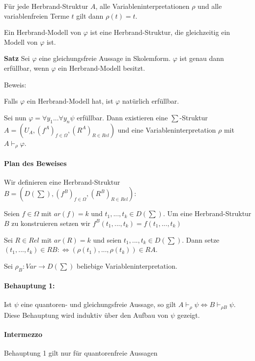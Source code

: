 \documentclass[a4paper]{article}
\renewcommand{\note}[2]{\begin{noteBox} \textbf{#1} #2 \end{noteBox}}
\begin{document}
\begin{multicols}{3}
  Für jede Herbrand-Struktur $A$, alle Variableninterpretationen $\rho$ und alle variablenfreien Terme $t$ gilt dann $\rho(t) =t$.

  Ein Herbrand-Modell von $\varphi$ ist eine Herbrand-Struktur, die gleichzeitig ein Modell von $\varphi$ ist.

  \note{Satz}{Sei $\varphi$ eine gleichungsfreie Aussage in Skolemform. $\varphi$ ist genau dann erfüllbar, wenn $\varphi$ ein Herbrand-Modell besitzt.}

  Beweis:
  \begin{itemize*}
    \item Falls $\varphi$ ein Herbrand-Modell hat, ist $\varphi$ natürlich erfüllbar.
    \item Sei nun $\varphi=\forall y_1...\forall y_n\psi$ erfüllbar. Dann existieren eine $\sum$-Struktur $A=(U_A,(f^A)_{f\in\Omega},(R^A)_{R\in Rel})$ und eine Variableninterpretation $\rho$ mit $A\vdash_\rho \varphi$.
  \end{itemize*}

  \paragraph{Plan des Beweises}
  Wir definieren eine Herbrand-Struktur $B=(D(\sum),(f^B)_{f\in\Omega},(R^B)_{R\in Rel})$:
  \begin{itemize*}
    \item Seien $f\in\Omega$ mit $ar(f)=k$ und $t_1,...,t_k\in D(\sum)$. Um eine Herbrand-Struktur $B$ zu konstruieren setzen wir $f^B(t_1,...,t_k) =f(t_1,...,t_k)$
    \item Sei $R\in Rel$ mit $ar(R)=k$ und seien $t_1,...,t_k\in D(\sum)$. Dann setze $(t_1,...,t_k)\in RB:\Leftrightarrow (\rho(t_1),...,\rho(t_k))\in RA$.
  \end{itemize*}

  Sei $\rho_B:Var \rightarrow D(\sum)$ beliebige Variableninterpretation.

  \paragraph{Behauptung 1: }
  Ist $\psi$ eine quantoren- und gleichungsfreie Aussage, so gilt $A\vdash_{\rho}\psi \Leftrightarrow B\vdash_{\rho B} \psi$. Diese Behauptung wird induktiv über den Aufbau von $\psi$ gezeigt.

  \paragraph{Intermezzo}
  Behauptung 1 gilt nur für quantorenfreie Aussagen


\end{multicols}
\end{document}
